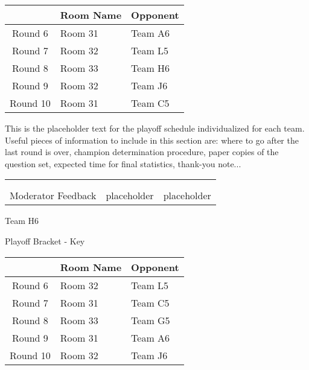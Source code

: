 \documentclass{article}%
\begin{document}
\vspace*{4pt}%
%
\begin{tabularx}{\textwidth}{|c|Y|Y|}%
\hline%
&Room Name&Opponent\\%
\hline%
Round 6&Room 31&Team A6\\%
Round 7&Room 32&Team L5\\%
Round 8&Room 33&Team H6\\%
Round 9&Room 32&Team J6\\%
Round 10&Room 31&Team C5\\%
\hline%
\end{tabularx}%
\vspace*{30pt}%
\linebreak%
This is the placeholder text for the playoff schedule individualized for each team. Useful pieces of information to include in this section are: where to go after the last round is over, champion determination procedure, paper copies of the question set, expected time for final statistics, thank{-}you note...%
\vspace*{30pt}%
\newline%
%
\begin{tabularx}{\textwidth}{YYY}%
  &  &  \\%
\\%
Moderator Feedback&placeholder&placeholder\\%
\end{tabularx}%
\newpage%
\begin{center}%
\begin{Huge}%
Team H6%
\end{Huge}%
\vspace*{12pt}%
\linebreak%
\begin{Large}%
Playoff Bracket {-} Key%
\end{Large}%
\end{center}%
\vspace*{4pt}%
%
\begin{tabularx}{\textwidth}{|c|Y|Y|}%
\hline%
&Room Name&Opponent\\%
\hline%
Round 6&Room 32&Team L5\\%
Round 7&Room 31&Team C5\\%
Round 8&Room 33&Team G5\\%
Round 9&Room 31&Team A6\\%
Round 10&Room 32&Team J6\\%
\hline%
\end{tabularx}%
\end{document}
